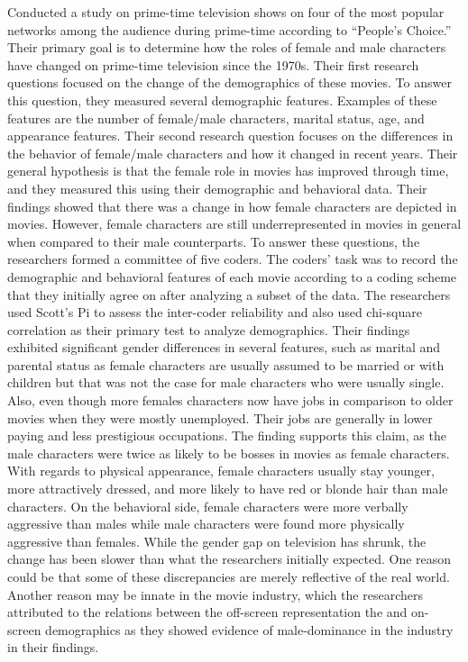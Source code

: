 \documentclass[11pt,a4paper]{article}
\begin{document}
\cite{Glascock2001GenderTelevision} Conducted a study on prime-time television shows on four of the most popular networks among the audience during prime-time according to “People’s Choice.” Their primary goal is to determine how the roles of female and male characters have changed on prime-time television since the 1970s. Their first research questions focused on the change of the demographics of these movies. To answer this question, they measured several demographic features. Examples of these features are the number of female/male characters, marital status, age, and appearance features. Their second research question focuses on the differences in the behavior of female/male characters and how it changed in recent years. Their general hypothesis is that the female role in movies has improved through time, and they measured this using their demographic and behavioral data. Their findings showed that there was a change in how female characters are depicted in movies. However, female characters are still underrepresented in movies in general when compared to their male counterparts. To answer these questions, the researchers formed a committee of five coders. The coders' task was to record the demographic and behavioral features of each movie according to a coding scheme that they initially agree on after analyzing a subset of the data. The researchers used Scott’s Pi to assess the inter-coder reliability and also used chi-square correlation as their primary test to analyze demographics. Their findings exhibited significant gender differences in several features, such as marital and parental status as female characters are usually assumed to be married or with children but that was not the case for male characters who were usually single. Also, even though more females characters now have jobs in comparison to older movies when they were mostly unemployed. Their jobs are generally in lower paying and less prestigious occupations. The finding supports this claim, as the male characters were twice as likely to be bosses in movies as female characters. With regards to physical appearance, female characters usually stay younger, more attractively dressed, and more likely to have red or blonde hair than male characters. On the behavioral side, female characters were more verbally aggressive than males while male characters were found more physically aggressive than females. While the gender gap on television has shrunk, the change has been slower than what the researchers initially expected. One reason could be that some of these discrepancies are merely reflective of the real world. Another reason may be innate in the movie industry, which the researchers attributed to the relations between the off-screen representation the and on-screen demographics as they showed evidence of male-dominance in the industry in their findings. \\
\end{document}
